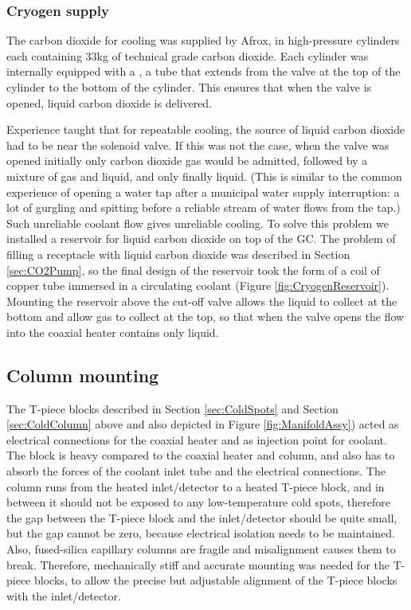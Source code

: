 \subsubsection{Cryogen supply}

The carbon dioxide for cooling was supplied by Afrox, in high-pressure
cylinders each containing 33kg of technical grade carbon dioxide. Each cylinder
was internally equipped with a , a tube that extends from the
valve at the top of the cylinder to the bottom of the cylinder. This ensures
that when the valve is opened, liquid carbon dioxide is delivered.

Experience taught that for repeatable cooling, the source of liquid carbon
dioxide had to be near the solenoid valve. If this was not the case, when the
valve was opened initially only carbon dioxide gas would be admitted, followed
by a mixture of gas and liquid, and only finally liquid. (This is similar to the
common experience of opening a water tap after a municipal water supply
interruption: a lot of gurgling and spitting before a reliable stream of water
flows from the tap.) Such unreliable coolant flow gives unreliable cooling.
To solve this problem we installed a reservoir for liquid carbon dioxide on top
of the GC. The problem of filling a receptacle with liquid carbon dioxide was
described in Section \ref{sec:CO2Pump}, so the final design of the reservoir
took the form of a coil of copper tube immersed in a circulating coolant (Figure
\ref{fig:CryogenReservoir}). Mounting the reservoir above the cut-off valve
allows the liquid to collect at the bottom and allow gas to collect at the top,
so that when the valve opens the flow into the coaxial heater contains only
liquid.

\subsection{Column mounting}

The T-piece blocks described in Section \ref{sec:ColdSpots} and Section
\ref{sec:ColdColumn} above and also depicted in Figure \ref{fig:ManifoldAssy}) acted as electrical
connections for the coaxial heater and as injection point for coolant. The block
is heavy compared to the coaxial heater and column, and also has to absorb the
forces of the coolant inlet tube and the electrical connections. The column runs
from the heated inlet/detector to a heated T-piece block, and in between it
should not be exposed to any low-temperature cold spots, therefore the gap
between the T-piece block and the inlet/detector should be quite small, but the
gap cannot be zero, because electrical isolation needs to be maintained.
Also, fused-silica capillary columns are fragile and misalignment causes them to
break. Therefore, mechanically stiff and accurate mounting was needed for the
T-piece blocks, to allow the precise but adjustable alignment of the T-piece
blocks with the inlet/detector.

